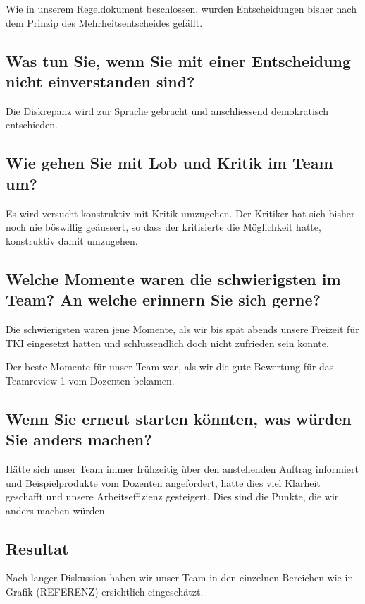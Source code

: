 Wie in unserem Regeldokument beschlossen, wurden Entscheidungen bisher nach dem Prinzip des Mehrheitsentscheides gefällt.

\subsection*{Was tun Sie, wenn Sie mit einer Entscheidung nicht einverstanden sind?}

Die Diskrepanz wird zur Sprache gebracht und anschliessend demokratisch entschieden.

\subsection*{Wie gehen Sie mit Lob und Kritik im Team um?}

Es wird versucht konstruktiv mit Kritik umzugehen. Der Kritiker hat sich bisher noch nie böswillig geäussert, so dass der kritisierte die Möglichkeit hatte, konstruktiv damit umzugehen. 

\subsection*{Welche Momente waren die schwierigsten im Team? An welche erinnern Sie sich
gerne?}

Die schwierigsten waren jene Momente, als wir bis spät abends unsere Freizeit für TKI eingesetzt hatten und schlussendlich doch nicht zufrieden sein konnte. 

Der beste Momente für unser Team war, als wir die gute Bewertung für das Teamreview 1 vom Dozenten bekamen.  

\subsection*{Wenn Sie erneut starten könnten, was würden Sie anders machen?}

Hätte sich unser Team immer frühzeitig über den anstehenden Auftrag informiert und Beispielprodukte vom Dozenten angefordert, hätte dies viel Klarheit geschafft und unsere Arbeitseffizienz gesteigert. Dies sind die Punkte, die wir anders machen würden. 

\subsection*{Resultat}

Nach langer Diskussion haben wir unser Team in den einzelnen Bereichen wie in Grafik (REFERENZ) ersichtlich eingeschätzt.

